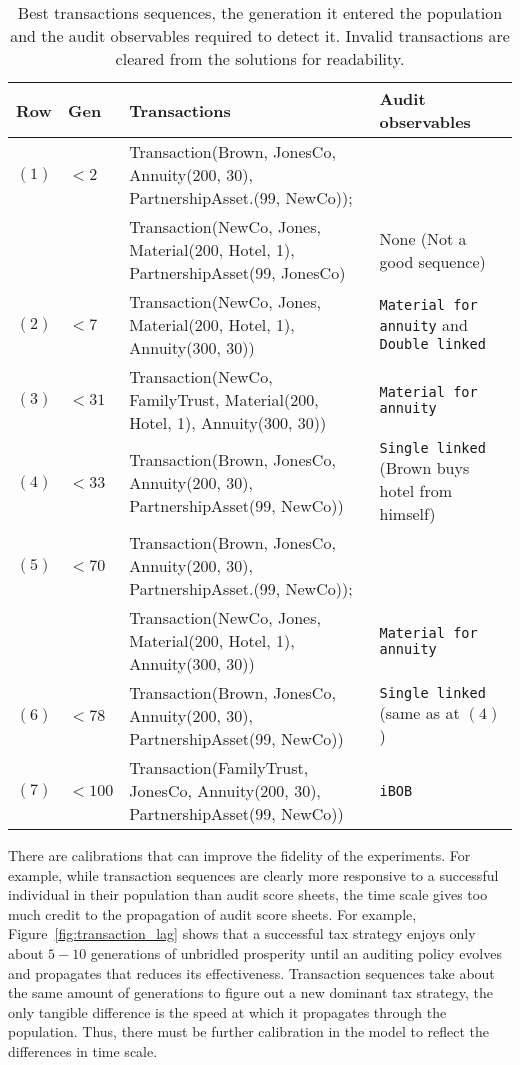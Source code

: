 \begin{table}[htb]
  \footnotesize
  \centering
  \caption{Best transactions sequences, the generation it entered the
    population and the audit observables required to detect
    it. Invalid transactions are cleared from the solutions for
    readability.}
  \label{tab:best_transactions}
  \begin{tabular}{p{0.5cm} p{0.8cm}|p{5.2cm}|p{4.0cm}}
    \textbf{Row} & \textbf{Gen} & \textbf{Transactions} & \textbf{Audit observables} \\
    \hline %
    $(1)$ & $<2$ &
    Transaction(Brown, JonesCo, Annuity(200, 30), PartnershipAsset.(99, NewCo)); & \\
    & & Transaction(NewCo, Jones, Material(200, Hotel, 1), PartnershipAsset(99, JonesCo)
    &
    None (Not a good sequence)
\\
\hline %
$(2)$ & $ <7$ &
Transaction(NewCo, Jones, Material(200, Hotel, 1), Annuity(300, 30))
&
\texttt{Material for annuity} and \texttt{Double linked}
\\
\hline %
$(3)$ & $ <31$ &
Transaction(NewCo, FamilyTrust, Material(200, Hotel, 1), Annuity(300, 30))
&
\texttt{Material for annuity}
 \\
 \hline %
 $(4)$ & $ <33$ &
 Transaction(Brown, JonesCo, Annuity(200, 30), PartnershipAsset(99, NewCo))
 &
\texttt{Single linked} (Brown buys hotel from himself)
 \\
 \hline %
 $(5)$ & $ <70$ &
 Transaction(Brown, JonesCo, Annuity(200, 30), PartnershipAsset.(99, NewCo)); & \\
 & & Transaction(NewCo, Jones, Material(200, Hotel, 1), Annuity(300, 30))
 &
\texttt{Material for annuity}
 \\
 \hline %
 $(6)$ & $ <78$ &
 Transaction(Brown, JonesCo, Annuity(200, 30), PartnershipAsset(99, NewCo))
 &
 \texttt{Single linked} (same as at $(4)$)
 \\
 \hline %
 $(7)$ & $ <100$ &
 Transaction(FamilyTrust, JonesCo, Annuity(200, 30), PartnershipAsset(99, NewCo))
 &
 \texttt{iBOB}
 \\
  \end{tabular}
\end{table}

There are calibrations that can improve the fidelity of the
experiments. For example, while transaction sequences are clearly more
responsive to a successful individual in their population than audit
score sheets, the time scale gives too much credit to the propagation
of audit score sheets. For example, Figure~\ref{fig:transaction_lag}
shows that a successful tax strategy enjoys only about $5-10$
generations of unbridled prosperity until an auditing policy evolves
and propagates that reduces its effectiveness. Transaction sequences
take about the same amount of generations to figure out a new dominant
tax strategy, the only tangible difference is the speed at which it
propagates through the population. Thus, there must be further
calibration in the model to reflect the differences in time scale.
